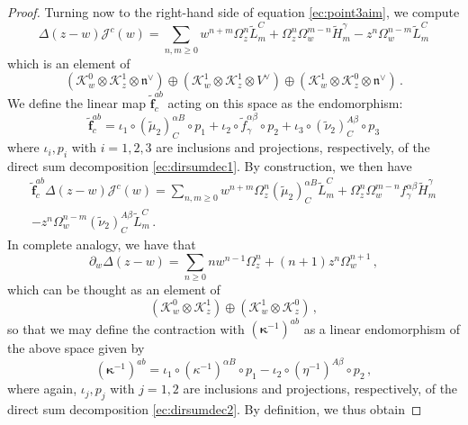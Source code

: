 \documentclass[11pt]{amsart}
\newcommand{\tL}{{\tilde L}}
\newcommand{\tH}{{\tilde H}}
\newcommand{\CK}{{\mathcal K}}
\newcommand{\fn}{\mathfrak{n}}
\numberwithin{equation}{section}
\numberwithin{figure}{section}
\numberwithin{table}{section}
\theoremstyle{thm}
\numberwithin{equation}{subsection}
\theoremstyle{definition}
\theoremstyle{rem}
\begin{document}
\begin{proof}
Turning now to the right-hand side of equation \eqref{ec:point3aim}, we compute 
\begin{equation}
    \Delta(z-w)\mathcal{J}^c(w)=\sum_{n,m\geq 0}w^{n+m}\Omega_z^n\tL_m^C + \Omega_z^n\Omega_{w}^{m-n}\tH_m^\gamma -z^n\Omega_w^{n-m}\tL_m^C
\end{equation}
which is an element of 
\begin{equation}
\label{ec:dirsumdec1}
    (\mathcal{K}_w^0\otimes \mathcal{K}_z^1\otimes \fn^\vee)\oplus(\mathcal{K}_w^1\otimes \mathcal{K}_z^1\otimes V^\vee)\oplus(\mathcal{K}_w^1\otimes \mathcal{K}_z^0\otimes \fn^\vee)\,.
\end{equation}
We define the linear map $\mathbf{\tilde f}^{ab}_c$ acting on this space as the endomorphism:
\begin{equation}
    \mathbf{\tilde f}^{ab}_c=\iota_1 \circ (\tilde{\mu}_2)^{\alpha B}_C \circ p_1 + \iota_2 \circ \tilde f^{\alpha \beta}_\gamma\circ p_2 + \iota_3 \circ (\tilde{\nu}_2)^{A\beta}_C \circ p_3
\end{equation}
where $\iota_i,p_i$ with $i=1,2,3$ are inclusions and projections, respectively, of the direct sum decomposition \eqref{ec:dirsumdec1}. By construction, we then have 
\begin{multline}
\label{ec:granf1}
    \mathbf{\tilde f}^{ab}_c\Delta(z-w)\mathcal{J}^c(w) = \sum_{n,m\geq 0}w^{n+m}\Omega_z^n(\tilde{\mu}_2)^{\alpha B}_C\tL_m^C + \Omega_z^n\Omega_{w}^{m-n}f^{\alpha \beta}_\gamma\tH_m^\gamma \\
    -z^n\Omega_w^{n-m}(\tilde{\nu}_2)^{A\beta}_C\tL_m^C\,.
\end{multline}
In complete analogy, we have that
\begin{equation}
    \partial_w\Delta(z-w)=\sum_{n\geq 0} nw^{n-1}\Omega_z^n + (n+1)z^n\Omega_w^{n+1}\,,
\end{equation}
which can be thought as an element of 
\begin{equation}
\label{ec:dirsumdec2}
    (\CK_w^0\otimes \CK_z^1)\oplus(\CK_w^1\otimes \CK_z^0)\,,
\end{equation}
so that we may define the contraction with $(\bm{\kappa}^{-1})^{ab}$ as a linear endomorphism of the above space given by 
\begin{equation}
    (\bm{\kappa}^{-1})^{ab}=\iota_1\circ (\kappa^{-1})^{\alpha B}\circ p_1 - \iota_2\circ (\eta^{-1})^{A\beta}\circ p_2\,,
\end{equation}
where again, $\iota_j,p_j$ with $j=1,2$ are inclusions and projections, respectively, of the direct sum decomposition \eqref{ec:dirsumdec2}. By definition, we thus obtain

\end{proof}
\end{document}
